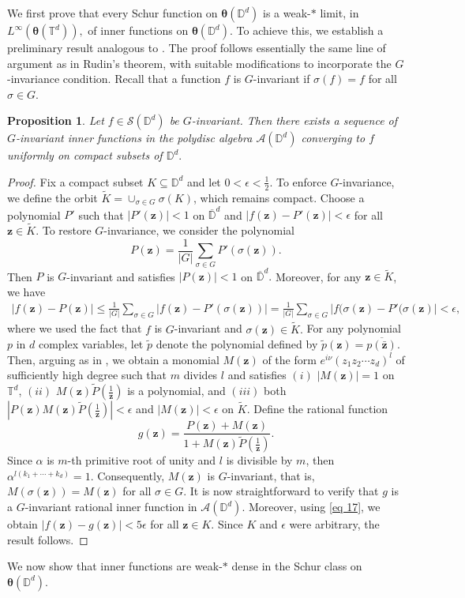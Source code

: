 \documentclass[12pt,reqno]{amsart}
\newtheorem{proposition}[theorem]{Proposition}%
\theoremstyle{remark}
\theoremstyle{definition}
\newcommand{\beq}{\begin{eqnarray}}
\newcommand{\eeq}{\end{eqnarray}}
\def \z{\boldsymbol{z}}
\begin{document}
We first prove that every Schur function on $\boldsymbol \theta(\mathbb D^d)$ is a weak-$*$ limit, in $L^\infty(\boldsymbol \theta(\mathbb T^d)),$ of inner functions on $\boldsymbol \theta(\mathbb D^d).$ 
To achieve this, we establish a preliminary result analogous to \cite[Theorem 5.5.1]{Rd1969}. The proof follows essentially the same line of argument as in Rudin’s theorem, with suitable modifications to incorporate the $G$-invariance condition. Recall that a function $f$ is $G$-invariant if $\sigma(f)=f$ for all $\sigma \in G.$
\begin{proposition}\label{caratheory}
    Let $f \in \mathcal{S}(\mathbb D^d)$ be $G$-invariant. Then there exists a sequence of $G$-invariant inner functions in the polydisc algebra $\mathcal{A}(\mathbb D^d)$ converging to $f$ uniformly on compact subsets of $\mathbb D^d.$ 
\end{proposition}
\begin{proof}
Fix a compact subset $K\subseteq \mathbb D^d$ and let $0<\epsilon<\frac{1}{2}.$ To enforce $G$-invariance, we define the orbit $\tilde{K}=\cup_{\sigma\in G} \sigma(K)$, which remains compact.
Choose a polynomial $P'$ such that $|P'(\z)| <1$ on $\overline{\mathbb D}^d$ and $|f(\boldsymbol{z}) - P'(\boldsymbol{z})| < \epsilon$ for all $\boldsymbol{z} \in \tilde{K}$.
To restore $G$-invariance, we consider the polynomial
$$ P(\boldsymbol{z}) = \frac{1}{|G|} \sum_{\sigma \in G} P'(\sigma(\z)). $$ Then $P$ is $G$-invariant and satisfies $|P(\z)| <1$  on $\overline{\mathbb D}^d.$ Moreover, for any $\z \in \tilde{K}$, we have
\beq \label{eq 17} |f(\boldsymbol{z}) - P(\boldsymbol{z})| \leq \frac{1}{|G|} \sum_{\sigma \in G} |f(\boldsymbol{z}) - P'(\sigma(\boldsymbol{z}))| = \frac{1}{|G|} \sum_{\sigma \in G} |f(\sigma(\boldsymbol{z}) - P'(\sigma(\boldsymbol{z})| < \epsilon, \eeq 
where we used the fact that $f$ is $G$-invariant and $\sigma(\z)\in \tilde{K}.$ For any polynomial $p$ in $d$ complex variables, let $\tilde{p}$ denote the polynomial defined by $\tilde{p}(\z)=\overline{p(\bar{\z})}.$  
Then, arguing as in \cite[Theorem~5.5.1]{Rd1969}, we obtain a monomial $M(\z)$ of the form $e^{i\nu} (z_1z_2\cdots z_d)^l$ of sufficiently high degree such that $m$ divides $l$ and satisfies $(i)$ $|M(\z)|=1$ on $\mathbb T^d$, $(ii)$ $M(\z) \tilde{P}(\frac{1}{\z})$ is a polynomial, and $(iii)$ both $|P(\z)M(\z)\tilde{P}(\frac{1}{\z})| <\epsilon$ and $|M(\z)|<\epsilon$ on $\tilde{K}.$ 
Define the rational function $$g(\z)=\frac{P(\z)+M(\z)}{1+M(\z)\tilde{P}(\frac{1}{\z})}.$$ Since $\alpha$ is $m$-th primitive root of unity and $l$ is divisible by $m$, then $\alpha^{l(k_1+\cdots+k_d)}=1$. Consequently, $M(\z)$ is $G$-invariant, that is, $M(\sigma(\z))=M(\z)$ for all $\sigma\in G.$ 
It is now straightforward to verify that $g$ is a $G$-invariant rational inner function in $\mathcal{A}(\mathbb D^d)$. Moreover, using \eqref{eq 17}, we obtain $|f(\z)-g(\z)| <5\epsilon$ for all $\z \in K.$ Since $K$ and $\epsilon$ were arbitrary, the result follows.
\end{proof}
 We now show that inner functions are weak-$*$ dense in the Schur class on $\boldsymbol \theta(\mathbb D^d).$
\end{document}
